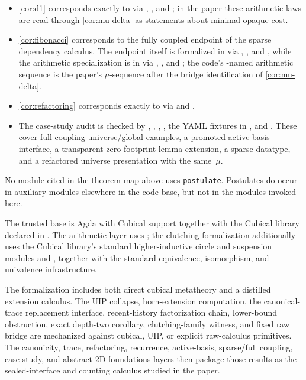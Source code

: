 \documentclass{lmcs}
\begin{document}
{\begin{itemize}[nosep]
\item \autoref{cor:d1} corresponds exactly to  via , , and ; in the paper these arithmetic laws are read through \autoref{cor:mu-delta} as statements about minimal opaque cost.
\item \autoref{cor:fibonacci} corresponds to the fully coupled endpoint of the sparse dependency calculus. The endpoint itself is formalized in  via , , and , while the arithmetic specialization is in  via , , and ; the code's -named arithmetic sequence is the paper's $\mu$-sequence after the bridge identification of \autoref{cor:mu-delta}.
\item \autoref{cor:refactoring} corresponds exactly to  via  and .
\item The case-study audit is checked by , , , , the YAML fixtures in , and . These cover full-coupling universe/global examples, a promoted active-basis interface, a transparent zero-footprint lemma extension, a sparse datatype, and a refactored universe presentation with the same~$\mu$.
\end{itemize}
}

No module cited in the theorem map above uses \texttt{postulate}. Postulates do occur in auxiliary modules elsewhere in the code base, but not in the modules invoked here.

The trusted base is Agda with Cubical support together with the Cubical library declared in . The arithmetic layer uses ; the clutching formalization additionally uses the Cubical library's standard higher-inductive circle and suspension modules  and , together with the standard equivalence, isomorphism, and univalence infrastructure.

The formalization includes both direct cubical metatheory and a distilled extension calculus. The UIP collapse, horn-extension computation, the canonical-trace replacement interface, recent-history factorization chain, lower-bound obstruction, exact depth-two corollary, clutching-family witness, and fixed raw bridge are mechanized against cubical, UIP, or explicit raw-calculus primitives. The canonicity, trace, refactoring, recurrence, active-basis, sparse/full coupling, case-study, and abstract $2$D-foundations layers then package those results as the sealed-interface and counting calculus studied in the paper.
\end{document}
